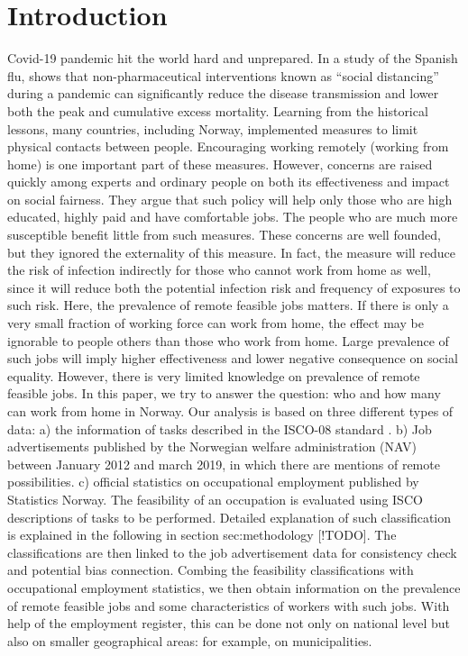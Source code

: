 \documentclass[11pt,]{article}
\begin{document}
\vskip -8.5pt



\noindent  

\hypertarget{introduction}{%
\section{Introduction}\label{introduction}}

Covid-19 pandemic hit the world hard and unprepared. In a study of the
Spanish flu, \citep{Hatchett7582} shows that non-pharmaceutical
interventions known as ``social distancing'' during a pandemic can
significantly reduce the disease transmission and lower both the peak
and cumulative excess mortality. Learning from the historical lessons,
many countries, including Norway, implemented measures to limit physical
contacts between people. Encouraging working remotely (working from
home) is one important part of these measures. However, concerns are
raised quickly among experts and ordinary people on both its
effectiveness and impact on social fairness. They argue that such policy
will help only those who are high educated, highly paid and have
comfortable jobs. The people who are much more susceptible benefit
little from such measures. These concerns are well founded, but they
ignored the externality of this measure. In fact, the measure will
reduce the risk of infection indirectly for those who cannot work from
home as well, since it will reduce both the potential infection risk and
frequency of exposures to such risk. Here, the prevalence of remote
feasible jobs matters. If there is only a very small fraction of working
force can work from home, the effect may be ignorable to people others
than those who work from home. Large prevalence of such jobs will imply
higher effectiveness and lower negative consequence on social equality.
However, there is very limited knowledge on prevalence of remote
feasible jobs. In this paper, we try to answer the question: who and how
many can work from home in Norway. Our analysis is based on three
different types of data: a) the information of tasks described in the
ISCO-08 standard \citep{ILO12}. b) Job advertisements published by the
Norwegian welfare administration (NAV) between January 2012 and march
2019, in which there are mentions of remote possibilities. c) official
statistics on occupational employment published by Statistics Norway.
The feasibility of an occupation is evaluated using ISCO descriptions of
tasks to be performed. Detailed explanation of such classification is
explained in the following in section sec:methodology {[}!TODO{]}. The
classifications are then linked to the job advertisement data for
consistency check and potential bias connection. Combing the feasibility
classifications with occupational employment statistics, we then obtain
information on the prevalence of remote feasible jobs and some
characteristics of workers with such jobs. With help of the employment
register, this can be done not only on national level but also on
smaller geographical areas: for example, on municipalities.
\end{document}
